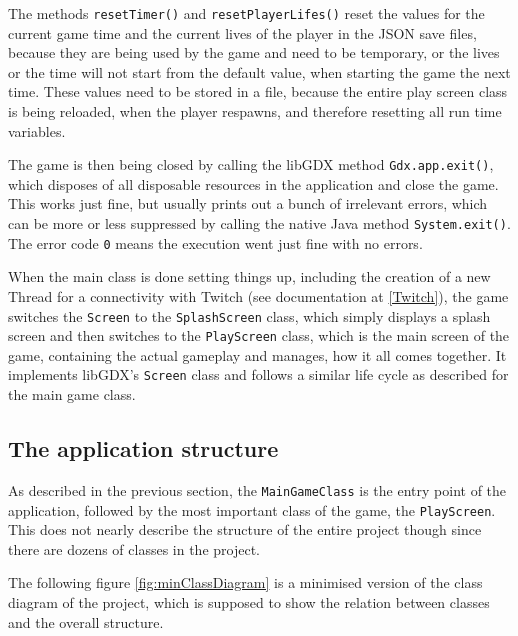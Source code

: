 \documentclass[12p]{article}
\begin{document}
The methods \texttt{resetTimer()} and \texttt{resetPlayerLifes()} reset the values for the current game time and the current lives of the player in the JSON save files, because they are being used by the game and need to be temporary, or the lives or the time will not start from the default value, when starting the game the next time. These values need to be stored in a file, because the entire play screen class is being reloaded, when the player respawns, and therefore resetting all run time variables.

The game is then being closed by calling the libGDX method \texttt{Gdx.app.exit()}, which disposes of all disposable resources in the application and close the game. This works just fine, but usually prints out a bunch of irrelevant errors, which can be more or less suppressed by calling the native Java method \texttt{System.exit()}. The error code \texttt{0} means the execution went just fine with no errors.

When the main class is done setting things up, including the creation of a new Thread for a connectivity with Twitch (see documentation at \ref{Twitch}), the game switches the \texttt{Screen} to the \texttt{SplashScreen} class, which simply displays a splash screen and then switches to the \texttt{PlayScreen} class, which is the main screen of the game, containing the actual gameplay and manages, how it all comes together. It implements libGDX's \texttt{Screen} class and follows a similar life cycle as described for the main game class.


\subsection{The application structure} \label{DocApplicationStructure}

As described in the previous section, the \texttt{MainGameClass} is the entry point of the application, followed by the most important class of the game, the \texttt{PlayScreen}. This does not nearly describe the structure of the entire project though since there are dozens of classes in the project.

The following figure \ref{fig:minClassDiagram} is a minimised version of the class diagram of the project, which is supposed to show the relation between classes and the overall structure.
\end{document}
